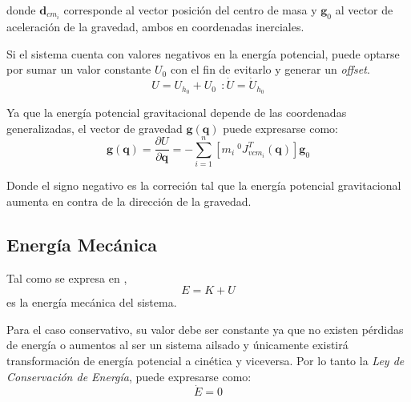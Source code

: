     donde $\boldsymbol{d}_{cm_i}$ corresponde al vector posición del centro de masa y $\boldsymbol{g}_0$ al vector de aceleración de la gravedad, ambos
    en coordenadas inerciales. 

    Si el sistema cuenta con valores negativos en la energía potencial, puede optarse por sumar un valor constante $U_0$ con el fin de evitarlo y generar un \emph{offset}. 
    \begin{equation}
        \label{eqn:energia_potencial_offset}
         U = U_{h_0}+U_0 \: \: : \dot{U} = \dot{U}_{h_0} 
    \end{equation}

    Ya que la energía potencial gravitacional depende de las coordenadas generalizadas, el vector de gravedad $\boldsymbol{g}(\boldsymbol{q})$ puede
    expresarse como:
    \begin{equation}
        \label{eqn:vector_gravedad}
        \boldsymbol{g}(\boldsymbol{q}) = \frac{\partial U}{\partial \boldsymbol{q}}=-\sum_{i=1}^n \left[m_i \: ^0J_{v{cm_i}}^T(\boldsymbol{q}) \right] \boldsymbol{g}_0
    \end{equation}

    Donde el signo negativo es la correción tal que la energía potencial gravitacional aumenta en contra de la dirección de la gravedad.

    \subsection{Energía Mecánica} 
    \noindent Tal como se expresa en \cite{theoretical_minimun},
    \begin{equation}
        \label{eqn:energia_mecanica}
         E = K + U
    \end{equation}
    es la energía mecánica del sistema.
    
    Para el caso conservativo, su valor debe ser constante ya que no existen pérdidas de energía o aumentos al ser un sistema ailsado y
    únicamente existirá transformación de energía potencial a cinética y viceversa. Por lo tanto la \emph{Ley de Conservación de Energía},
    puede expresarse como: 
    \begin{equation}
        \label{eqn:derivada_energia_mecanica}
         \dot{E} = 0
    \end{equation}